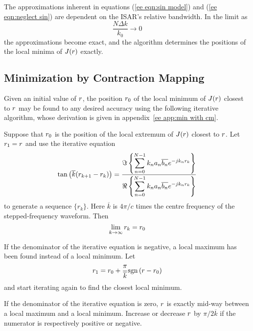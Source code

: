 The approximations inherent in equations (\ref{ee eqn:sin model}) and
(\ref{ee eqn:neglect sin}) are dependent on the ISAR's relative bandwidth.  
In the limit as
\begin{equation}
\frac{N\Delta k}{k_0}\rightarrow 0
\end{equation}
the approximations become exact, and the algorithm determines the
positions of the local minima of $J({r})$ exactly.

\subsection{Minimization by Contraction Mapping}

Given an initial value of ${r}$, the position ${r}_0$ of the local minimum
of $J({r})$ closest to ${r}$ may be found to any desired accuracy using
the following iterative algorithm, whose derivation is given in 
appendix~\ref{ee app:min with cm}.

\begin{algorithm}
\label{ee alg:min with cm}\mbox{}\par

Suppose that ${r}_0$ is the position of the local extremum of $J({r})$ closest
to ${r}$.  Let ${r}_1={r}$ and use the iterative equation
\begin{equation}
\tan\left(\overline{k}({r}_{k+1}-{r}_k)\right)=
\frac{
  \Im\left\{\displaystyle\sum_{n=0}^{N-1}k_na_n\overline{b_n}{e^{-jk_n{r}_k}}\right\}
}{
  \Re\left\{\displaystyle\sum_{n=0}^{N-1}k_na_n\overline{b_n}{e^{-jk_n{r}_k}}\right\}
}
\end{equation}
to generate a sequence $\{r_k\}$.  Here $\overline{k}$ is $4\pi/c$ times the 
centre frequency of the stepped-frequency waveform.   Then
\begin{equation}
\lim_{k\rightarrow\infty} {r}_k={r}_0
\end{equation}

If the denominator of the iterative equation is negative, a local maximum 
has been found instead of a local minimum.  Let
\begin{equation}
{r}_1={r}_0+\frac{\pi}{\overline{k}}{\mathop{\rm sgn}\nolimits}\left({r}-{r}_0\right)
\end{equation}
and start iterating again to find the closest local minimum.

If the denominator of the iterative equation is zero, ${r}$ is exactly
mid-way between a local maximum and a local minimum.  Increase or decrease
${r}$ by $\pi/2\overline{k}$ if the numerator is respectively 
positive or negative.
\end{algorithm}

